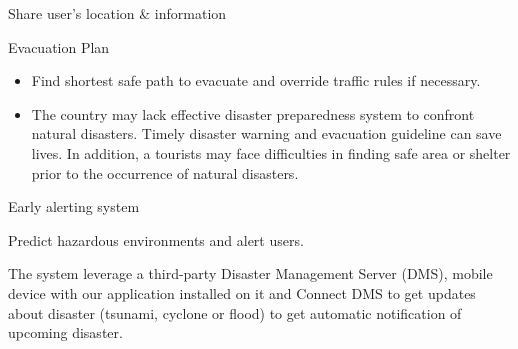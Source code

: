 \documentclass{beamer}
\begin{document}
\begin{frame}{Share user's location \& information}

\end{frame}


\begin{frame}{Evacuation Plan}
\begin{itemize}[<+->]

    \item Find shortest safe path to evacuate and override traffic rules if necessary.

    \item The country may lack effective disaster preparedness system to confront natural disasters. Timely disaster warning and evacuation guideline can save lives. In addition, a tourists may face difficulties in finding safe area or shelter prior to the occurrence of natural disasters.
\end{itemize} 
\end{frame}



\begin{frame}{Early alerting system}

Predict hazardous environments and alert users.

The system leverage a third-party Disaster Management Server (DMS), mobile device with our application installed on it and Connect DMS to get updates about disaster (tsunami, cyclone or flood) to get automatic notification of upcoming disaster.
    
\end{frame}
\end{document}
